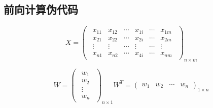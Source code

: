 
\subsection{前向计算伪代码}
\begin{equation*}
	X = 
	\begin{pmatrix}
		\begin{array}{c|c|c|c|c|c}
			x_{11}	&	x_{12}	&	  \cdots 	 &	 x_{1i}	   	 & \cdots		& x_{1m} \\
			x_{21}	&	x_{22}	&	 \cdots		& 	x_{2i}		& \cdots		& x_{2m} \\
			\vdots	&	\vdots	&	 \cdots		&	\vdots		& \cdots		& \vdots \\
			x_{n1}	&	x_{n2}	&	 \cdots 	& 	x_{4i}		& \cdots		& x_{nm} 
		\end{array}
	\end{pmatrix}_{n \times m}
\end{equation*}

\begin{equation*}
	W =
	\begin{pmatrix}
		\begin{array}{c}
			w_1 \\
			w_2 \\
			\vdots \\
			w_n
		\end{array}
	\end{pmatrix}_{n \times 1}
W^T = 
	\begin{pmatrix}
		w_1 & w_2 & \cdots & w_n
\end{pmatrix}_{1 \times n}
\end{equation*}





